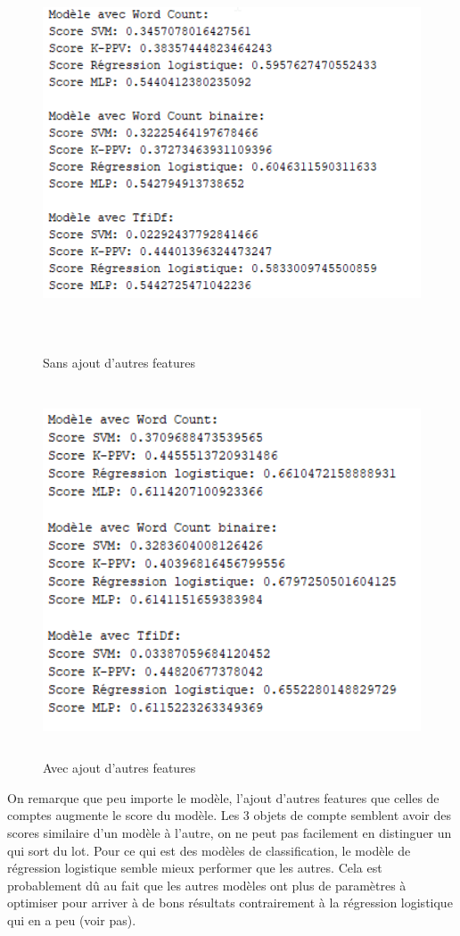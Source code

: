 \begin{figure}[h!] %
	\begin{minipage}[b]{0.45\textwidth}
		\includegraphics[width=\textwidth,height=11cm]{images/analyse_rapide_sans_features}	
		\caption*{Sans ajout d'autres features}
	\end{minipage}
	\hfill
	\begin{minipage}[b]{0.45\textwidth}
		\includegraphics[width=\textwidth,height=11cm]{images/analyse_rapide_avec_features}
		\caption*{Avec ajout d'autres features}
	\end{minipage}
\end{figure}
\clearpage

On remarque que peu importe le modèle, l'ajout d'autres features que celles de comptes augmente le score du modèle. Les 3 objets de compte semblent avoir des scores similaire d'un modèle à l'autre, on ne peut pas facilement en distinguer un qui sort du lot. Pour ce qui est des modèles de classification, le modèle de régression logistique semble mieux performer que les autres. Cela est probablement dû au fait que les autres modèles ont plus de paramètres à optimiser pour arriver à de bons résultats contrairement à la régression logistique qui en a peu (voir pas).